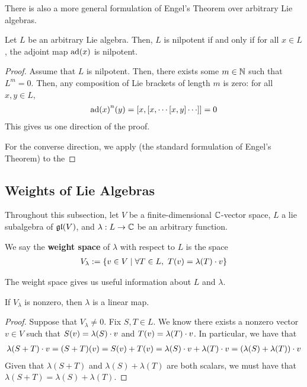 There is also a more general formulation of Engel's Theorem over arbitrary Lie algebras.

\begin{boxtheorem}\label{Ch1:Thm:EngelOverAnyLie}
    Let $L$ be an arbitrary Lie algebra. Then, $L$ is nilpotent if and only if for all $x \in L$, the adjoint map $\operatorname{ad}\!\left( x \right)$ is nilpotent.
\end{boxtheorem}
\begin{proof}
    Assume that $L$ is nilpotent. Then, there exists some $m \in \mathbb{N}$ such that $L^m = 0$. Then, any composition of Lie brackets of length $m$ is zero: for all $x, y \in L$,
    \begin{align*}
        \pad{x}^n\!(y) = \brac{x, \brac{x, \cdots \brac{x, y}\cdots}} = 0
    \end{align*}
    This gives us one direction of the proof.

    For the converse direction, we apply  (the standard formulation of Engel's Theorem) to the \sorry
\end{proof}

\subsection{Weights of Lie Algebras}

Throughout this subsection, let $V$ be a finite-dimensional $\mathbb{C}$-vector space, $L$ a lie subalgebra of $\mathfrak{gl}\!\left( V \right)$, and $\lambda : L \to \mathbb{C}$ be an arbitrary function.

\begin{boxdefinition}
    We say the \textbf{weight space} of $\lambda$ with respect to $L$ %
    is the space
    \begin{align*}
        V_{\lambda} := \left\{ v \in V \; \middle\vert \; \forall T \in L, \ T\!\left( v \right) = \lambda(T) \cdot v \right\}
    \end{align*}
\end{boxdefinition}

The weight space gives us useful information about $L$ and $\lambda$.

\begin{lemma}
    If $V_{\lambda}$ is nonzero, then $\lambda$ is a linear map.
\end{lemma}
\begin{proof}
    Suppose that $V_{\lambda} \neq 0$. Fix $S, T \in L$. We know there exists a nonzero vector $v \in V$ such that $S\!\left( v \right) = \lambda(S) \cdot v$ and $T\!\left( v \right) = \lambda(T) \cdot v$. In particular, we have that
    \begin{align*}
        \lambda(S + T) \cdot v = (S + T)(v) = S\!\left( v \right) + T\!\left( v \right) = \lambda(S) \cdot v + \lambda(T) \cdot v = (\lambda(S) + \lambda(T)) \cdot v
    \end{align*}
    Given that $\lambda(S + T)$ and $\lambda(S) + \lambda(T)$ are both scalars, we must have that $\lambda(S + T) = \lambda(S) + \lambda(T)$.
\end{proof}

